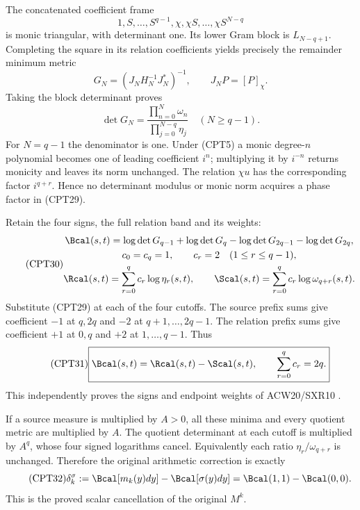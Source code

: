 The concatenated coefficient frame
\[
 1,S,\ldots,S^{q-1},\chi,\chi S,\ldots,\chi S^{N-q}
\]
is monic triangular, with determinant one.
Its lower Gram block is \(L_{N-q+1}\).  Completing the square
in its relation coefficients yields precisely the remainder
minimum metric
\[
 G_N=(J_NH_N^{-1}J_N^*)^{-1},\qquad
 J_NP=[P]_\chi.
\]
Taking the block determinant proves
\begin{equation}\tag{CPT29}
 \det G_N=
 \frac{\prod_{n=0}^N\omega_n}
      {\prod_{j=0}^{N-q}\eta_j}\quad(N\ge q-1).
\end{equation}
For \(N=q-1\) the denominator is one.
Under (CPT5) a monic degree-\(n\) polynomial becomes one of
leading coefficient \(i^n\); multiplying it by \(i^{-n}\)
returns monicity and leaves its norm unchanged.  The relation
\(\chi u\) has the corresponding factor \(i^{q+r}\).
Hence no determinant modulus or monic norm acquires a phase
factor in (CPT29).

Retain the four signs, the full relation band and its weights:
\begin{equation}\tag{CPT30}
\begin{gathered}
 \Bcal(s,t)=\log\det G_{q-1}+\log\det G_q
             -\log\det G_{2q-1}-\log\det G_{2q},\\
 c_0=c_q=1,\qquad c_r=2\quad(1\le r\le q-1),\\
 \Rcal(s,t)=\sum_{r=0}^q c_r\log\eta_r(s,t),\qquad
 \Scal(s,t)=\sum_{r=0}^q c_r\log\omega_{q+r}(s,t).
\end{gathered}
\end{equation}
Substitute (CPT29) at each of the four cutoffs.
The source prefix sums give coefficient \(-1\) at \(q,2q\)
and \(-2\) at \(q+1,\ldots,2q-1\).
The relation prefix sums give coefficient \(+1\) at \(0,q\)
and \(+2\) at \(1,\ldots,q-1\).  Thus
\begin{equation}\tag{CPT31}
 \boxed{\Bcal(s,t)=\Rcal(s,t)-\Scal(s,t),\qquad
 \sum_{r=0}^q c_r=2q.}
\end{equation}
This independently proves the signs and endpoint weights of
ACW20/SXR10 \cite{cpt:centralProvider,cpt:sourceRelation}.

If a source measure is multiplied by \(A>0\), all these minima
and every quotient metric are multiplied by \(A\).
The quotient determinant at each cutoff is multiplied by
\(A^q\), whose four signed logarithms cancel.
Equivalently each ratio \(\eta_r/\omega_{q+r}\) is unchanged.
Therefore the original arithmetic correction is exactly
\begin{equation}\tag{CPT32}
 \delta_k^\sigma
 :=\Bcal[m_k(y)dy]-\Bcal[\sigma(y)dy]
 =\Bcal(1,1)-\Bcal(0,0).
\end{equation}
This is the proved scalar cancellation of the original \(M^k\).

